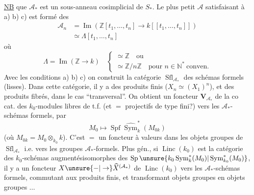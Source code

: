 \uline{NB}  que $\mathcal A_*$ est un sous-anneau cosimplicial de $S_*$. Le plus petit $\mathcal A$ satisfaisant à a) b) c) est formé des
\[
\begin{aligned}
\mathcal A_n&=\operatorname{Im}(\mathbb Z[t_1,\ldots,t_n]\longrightarrow k[[t_1,\ldots,t_n]])\\
&\simeq\Lambda[t_1,\ldots,t_n]
\end{aligned}
\]
où
\[
\Lambda=\operatorname{Im}(\mathbb Z\longrightarrow k)\quad
\left\{\begin{array}{l}\simeq\mathbb Z\quad\text{ou}\\\simeq\mathbb Z/n\mathbb Z\quad\text{pour }n\in\mathbb N^*\ \text{conven.}\end{array}\right.
\]
Avec les conditions a) b) c) on construit la catégorie  $\operatorname{Sfl}_{\mathcal A_*}$ des  schémas formels (lisses). Dans cette catégorie, il y a des produits finis ($X_n\simeq(X_1)^n$), et des produits fibrés, dans le cas ``transversal''.
On obtient un foncteur $\mathbf V_{\mathcal A_*}$ de la co cat. des $k_0$-modules libres de t.f. (et $=$ projectifs de type fini?) vers les $\mathcal A_*$-schémas formels, par
\[
M_0\longmapsto\operatorname{Spf}\widehat{\operatorname{Sym}}^*_k(M_{0k})
\]
(où $M_{0k}=M_0\otimes_{k_0}k$). C'est $=$ un foncteur à valeurs dans les objets groupes de $\operatorname{Sfl}_{\mathcal A_*}$ i.e. vers les groupes $\mathcal A_*$-formels.
Plus gén., si $\operatorname{Linc}(k_0)$ est la catégorie des $k_0$-schémas augmentésisomorphes \deleted{\unsure{$\xi$}} des \deleted{\unsure{$\xi$}} $\operatorname{Sp}\unsure{k_0\operatorname{Sym}^*_k(M_0)|\operatorname{Sym}^*_{k_0}(M_0)}$,  il y a un foncteur $X\unsure{-|\to}\widehat X^{(\mathcal A_*)}$ de $\operatorname{Linc}(k_0)$ vers les $\mathcal A_*$-schémas formels, commutant aux produits finis, et transformant objets groupes en objets groupes $\ldots$
